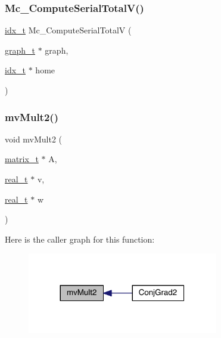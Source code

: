 \subsubsection{\texorpdfstring{Mc\+\_\+\+Compute\+Serial\+Total\+V()}{Mc\_ComputeSerialTotalV()}}
{\footnotesize\ttfamily \hyperlink{a00876_aaa5262be3e700770163401acb0150f52}{idx\+\_\+t} Mc\+\_\+\+Compute\+Serial\+TotalV (\begin{DoxyParamCaption}\item[{\hyperlink{a00734}{graph\+\_\+t} $\ast$}]{graph,  }\item[{\hyperlink{a00876_aaa5262be3e700770163401acb0150f52}{idx\+\_\+t} $\ast$}]{home }\end{DoxyParamCaption})}

\mbox{\label{a00353_a4ac5c2a9274b1ea7377f70e1047659db}} 
\subsubsection{\texorpdfstring{mv\+Mult2()}{mvMult2()}}
{\footnotesize\ttfamily void mv\+Mult2 (\begin{DoxyParamCaption}\item[{\hyperlink{a00754}{matrix\+\_\+t} $\ast$}]{A,  }\item[{\hyperlink{a00876_a1924a4f6907cc3833213aba1f07fcbe9}{real\+\_\+t} $\ast$}]{v,  }\item[{\hyperlink{a00876_a1924a4f6907cc3833213aba1f07fcbe9}{real\+\_\+t} $\ast$}]{w }\end{DoxyParamCaption})}

Here is the caller graph for this function\+:\nopagebreak
\begin{figure}[H]
\begin{center}
\leavevmode
\includegraphics[width=236pt]{a00353_a4ac5c2a9274b1ea7377f70e1047659db_icgraph}
\end{center}
\end{figure}
\mbox{\label{a00353_ae66862df97d3cf546259e4f679371730}} 
